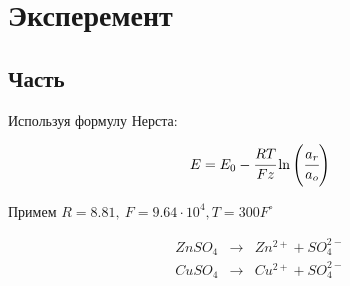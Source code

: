 \section{Эксперемент}

\subsection{Часть}

Используя формулу Нерста: 

\begin{equation}
  E = E_0 - \cfrac{RT}{Fz}\ln\left( \cfrac{a_{r}}{a_o} \right)  
\end{equation}

Примем $R = 8.81, \ F = 9.64\cdot10^4, T = 300F^{\circ}$

\begin{eqnarray}
  ZnSO_4 &\to& Zn^{2+} + SO_4^{2-} \\
  CuSO_4 &\to& Cu^{2+} + SO_4^{2-}
  
\end{eqnarray}












